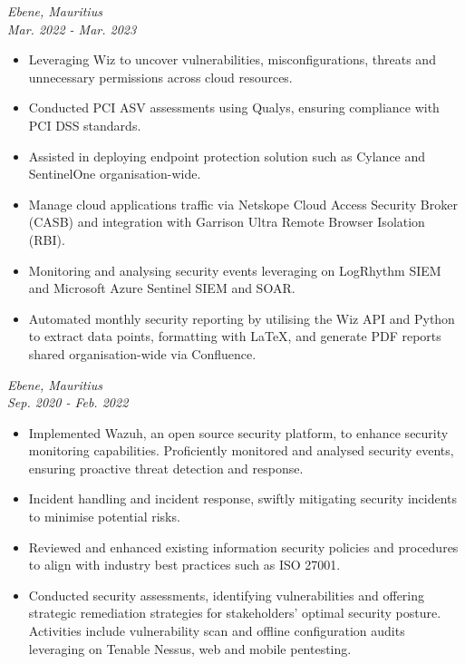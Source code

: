 \documentclass[a4paper, fleqn, oneside]{article}
\begin{document}
{ \hfill \textit{Ebene, Mauritius}} \\
{ \hfill {\textit{Mar. 2022 - Mar. 2023}}}
\begin{itemize}
\item Leveraging Wiz to uncover vulnerabilities, misconfigurations, threats and unnecessary permissions across cloud resources.
\item Conducted PCI ASV assessments using Qualys, ensuring compliance with PCI DSS standards.
\item Assisted in deploying endpoint protection solution such as Cylance and SentinelOne organisation-wide.
\item Manage cloud applications traffic via Netskope Cloud Access Security Broker (CASB) and integration with Garrison Ultra Remote Browser Isolation (RBI).
\item Monitoring and analysing security events leveraging on LogRhythm SIEM and Microsoft Azure Sentinel SIEM and SOAR.
\item Automated monthly security reporting by utilising the Wiz API and Python to extract data points, formatting with \LaTeX{}, and generate PDF reports shared organisation-wide via Confluence.
\end{itemize}

\vspace{2em}
{ \hfill \textit{Ebene, Mauritius}} \\
{ \hfill {\textit{Sep. 2020 - Feb. 2022}}}
\begin{itemize}
\item Implemented Wazuh, an open source security platform, to enhance security monitoring capabilities. Proficiently monitored and analysed security events, ensuring proactive threat detection and response.
\item Incident handling and incident response, swiftly mitigating security incidents to minimise potential risks.
\item Reviewed and enhanced existing information security policies and procedures to align with industry best practices such as ISO 27001.
\item Conducted security assessments, identifying vulnerabilities and offering strategic remediation strategies for stakeholders’ optimal security posture. Activities include vulnerability scan and offline configuration audits leveraging on Tenable Nessus, web and mobile pentesting.
\end{itemize}
\end{document}
